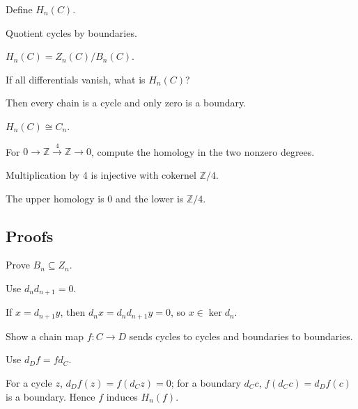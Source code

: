 \begin{exercise}[Homology]\label{exr:viii16-ped-03}
Define $H_n(C)$.
\end{exercise}
\begin{hint}
Quotient cycles by boundaries.
\end{hint}
\begin{solution}
$H_n(C)=Z_n(C)/B_n(C)$.
\end{solution}

\begin{exercise}\label{exr:viii16-ped-04}
If all differentials vanish, what is $H_n(C)$?
\end{exercise}
\begin{hint}
Then every chain is a cycle and only zero is a boundary.
\end{hint}
\begin{solution}
$H_n(C)\cong C_n$.
\end{solution}

\begin{exercise}\label{exr:viii16-ped-05}
For $0\to\mathbb Z\xrightarrow{4}\mathbb Z\to0$, compute the homology in the two nonzero degrees.
\end{exercise}
\begin{hint}
Multiplication by 4 is injective with cokernel $\mathbb Z/4$.
\end{hint}
\begin{solution}
The upper homology is $0$ and the lower is $\mathbb Z/4$.
\end{solution}

\subsection*{Proofs}

\begin{exercise}\label{exr:viii16-ped-06}
Prove $B_n\subseteq Z_n$.
\end{exercise}
\begin{hint}
Use $d_nd_{n+1}=0$.
\end{hint}
\begin{solution}
If $x=d_{n+1}y$, then $d_nx=d_nd_{n+1}y=0$, so $x\in\ker d_n$.
\end{solution}

\begin{exercise}\label{exr:viii16-ped-07}
Show a chain map $f:C\to D$ sends cycles to cycles and boundaries to boundaries.
\end{exercise}
\begin{hint}
Use $d_Df=fd_C$.
\end{hint}
\begin{solution}
For a cycle $z$, $d_Df(z)=f(d_Cz)=0$; for a boundary $d_Cc$, $f(d_Cc)=d_Df(c)$ is a boundary. Hence $f$ induces $H_n(f)$.
\end{solution}

